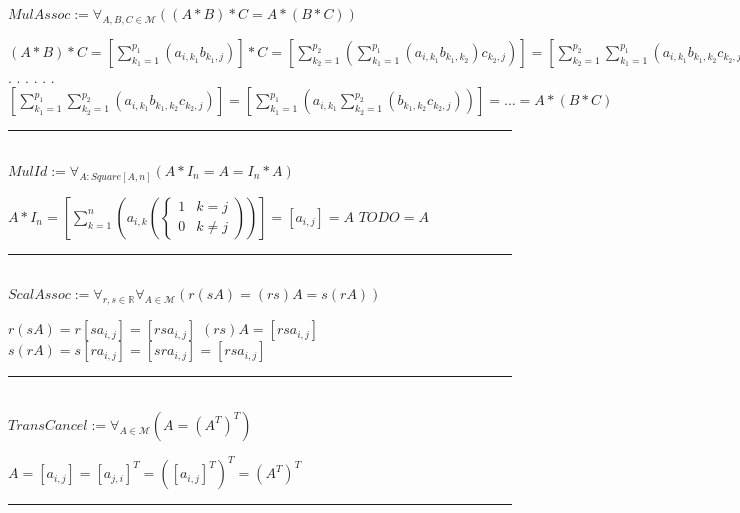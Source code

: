 \documentclass{book}
\newcommand{\abr}{:=}
\newcommand{\cont}{\phantom{.}. . .\phantom{.}}
\newcommand{\pr}[1]{\left(#1\right)}
\begin{document}
$MulAssoc \abr \forall_{A, B, C \in \mathcal{M}}\pr{(A * B) * C = A * (B * C)}$
\begin{enumerate}
  \lit $(A * B) * C = \left[\sum_{k_1 = 1}^{p_1}(a_{i, k_1} b_{k_1, j})\right] * C = \left[\sum_{k_2 = 1}^{p_2}\pr{\sum_{k_1 = 1}^{p_1}(a_{i, k_1} b_{k_1, k_2}) c_{k_2, j}}\right] = \left[\sum_{k_2 = 1}^{p_2} \sum_{k_1 = 1}^{p_1}(a_{i, k_1} b_{k_1, k_2} c_{k_2, j})\right] = $ \cont
  \lit \cont $\left[\sum_{k_1 = 1}^{p_1} \sum_{k_2 = 1}^{p_2}(a_{i, k_1} b_{k_1, k_2} c_{k_2, j})\right] = \left[\sum_{k_1 = 1}^{p_1}\pr{a_{i, k_1} \sum_{k_2 = 1}^{p_2}(b_{k_1, k_2} c_{k_2, j})}\right] = \ldots = A * (B * C)$
\end{enumerate} \vspace{.75mm} \hrule \vspace{.75mm} \ \\ 

$MulId \abr \forall_{A : Square[A, n]}(A * I_n = A = I_n * A)$
\begin{enumerate}
  \lit $A * I_n = \left[\sum_{k = 1}^{n}\left(a_{i, k} 
    \left(\begin{cases} 
      1 & k = j \\
      0 & k \neq j 
    \end{cases}\right)
  \right)\right] = [a_{i, j}] = A$
  \lit $TODO = A$
\end{enumerate} \vspace{.75mm} \hrule \vspace{.75mm} \ \\ 

$ScalAssoc \abr \forall_{r, s \in \mathbb{R}} \forall_{A \in \mathcal{M}}\pr{r (s A) = (r s) A = s (r A)}$
\begin{enumerate}
  \lit $r (s A) = r [s a_{i, j}] = [r s a_{i, j}]$
  \lit $(r s) A = [r s a_{i, j}]$
  \lit $s (r A) = s [r a_{i, j}] = [s r a_{i, j}] = [r s a_{i, j}]$
\end{enumerate} \vspace{.75mm} \hrule \vspace{.75mm} \ \\ 

$TransCancel \abr \forall_{A \in \mathcal{M}}\pr{A = (A^T)^T}$
\begin{enumerate}
  \lit $A = [a_{i, j}] = [a_{j, i}]^T = ([a_{i, j}]^T)^T = (A^T)^T$
\end{enumerate} \vspace{.75mm} \hrule \vspace{.75mm} \ \\ 
\end{document}
